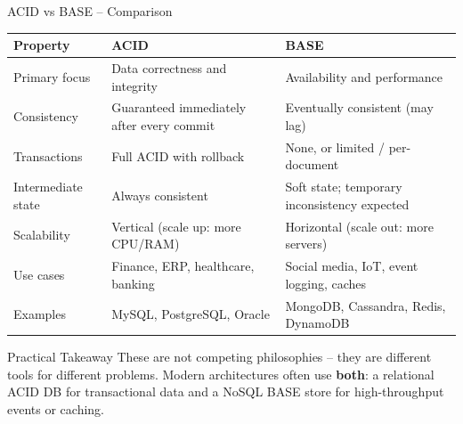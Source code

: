 \begin{frame}{ACID vs BASE -- Comparison}
  \begin{center}
  \renewcommand{\arraystretch}{1.3}
  \begin{tabularx}{\linewidth}{@{}lXX@{}}
    \toprule
    \textbf{Property} & \textbf{ACID} & \textbf{BASE} \\
    \midrule
    Primary focus   & Data correctness and integrity & Availability and performance \\
    Consistency     & Guaranteed immediately after every commit & Eventually consistent (may lag) \\
    Transactions    & Full ACID with rollback & None, or limited / per-document \\
    Intermediate state & Always consistent & Soft state; temporary inconsistency expected \\
    Scalability     & Vertical (scale up: more CPU/RAM) & Horizontal (scale out: more servers) \\
    Use cases       & Finance, ERP, healthcare, banking & Social media, IoT, event logging, caches \\
    Examples        & MySQL, PostgreSQL, Oracle & MongoDB, Cassandra, Redis, DynamoDB \\
    \bottomrule
  \end{tabularx}
  \end{center}

  \begin{block}{Practical Takeaway}
    These are not competing philosophies -- they are different tools for different problems.
    Modern architectures often use \textbf{both}: a relational ACID DB for transactional data
    and a NoSQL BASE store for high-throughput events or caching.
  \end{block}
\end{frame}


